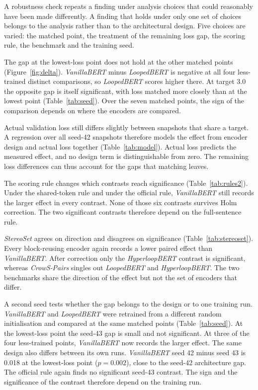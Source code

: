 \documentclass[sigconf,natbib=true]{acmart}
\begin{document}
A robustness check repeats a finding under analysis choices that could
reasonably have been made differently. A finding that holds under only one set of
choices belongs to the analysis rather than to the architectural design. Five choices are
varied: the matched point, the treatment of the remaining loss gap, the scoring
rule, the benchmark and the training seed.

The gap at the lowest-loss point does not hold at the other matched points
(Figure~\ref{fig:delta}). \emph{VanillaBERT} minus \emph{LoopedBERT} is negative
at all four less-trained distinct comparisons, so \emph{LoopedBERT} scores
higher there. At target 3.0 the opposite gap is itself significant, with loss
matched more closely than at the lowest point (Table~\ref{tab:seed}). Over the
seven matched points, the sign of the comparison depends on where the encoders
are compared.

Actual validation loss still differs slightly between snapshots that share a
target. A regression over all seed-42 snapshots therefore models the effect from
encoder design and actual loss together (Table~\ref{tab:model}). Actual loss
predicts the measured effect, and no design term is distinguishable from zero.
The remaining loss differences can thus account for the gaps that matching
leaves.

The scoring rule changes which contrasts reach significance
(Table~\ref{tab:rules2}). Under the shared-token rule and under the official
rule, \emph{VanillaBERT} still records the larger effect in every contrast.
None of those six contrasts survives Holm correction. The two significant
contrasts therefore depend on the full-sentence rule.

\emph{StereoSet} agrees on direction and disagrees on significance
(Table~\ref{tab:stereoset}). Every block-reusing encoder again records a lower
paired effect than \emph{VanillaBERT}. After correction only the
\emph{HyperloopBERT} contrast is significant, whereas \emph{CrowS-Pairs} singles
out \emph{LoopedBERT} and \emph{HyperloopBERT}. The two benchmarks share the
direction of the effect but not the set of encoders that differ.

A second seed tests whether the gap belongs to the design or to one training
run. \emph{VanillaBERT} and \emph{LoopedBERT} were retrained from a different
random initialisation and compared at the same matched points
(Table~\ref{tab:seed}). At the lowest-loss point the seed-43 gap is small and
not significant. At three of the four less-trained points, \emph{VanillaBERT}
now records the larger effect. The same design also differs between its own
runs. \emph{VanillaBERT} seed 42 minus seed 43 is 0.018 at the lowest-loss point
($p=0.002$), close to the seed-42 architecture gap. The official rule again
finds no significant seed-43 contrast. The sign and the significance of the
contrast therefore depend on the training run.
\end{document}
